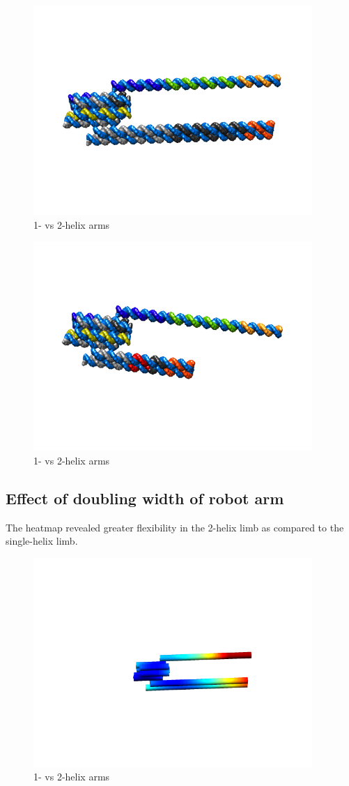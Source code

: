 \documentclass{article}
\begin{document}
\begin{figure}
\includegraphics[width=300pt]{long_atomic}
\caption{1- vs 2-helix arms}
  \label{fig:long_atomic}
\end{figure}

\begin{figure}
\includegraphics[width=300pt]{short_atomic}
\caption{1- vs 2-helix arms}
  \label{fig:short_atomic}
\end{figure}


\subsection{Effect of doubling width of robot arm}
The heatmap revealed greater flexibility in the 2-helix limb as compared to the single-helix limb. 
\begin{figure}
    \includegraphics[width=300pt]{single_arm_vs_double_heat}
  \caption{1- vs 2-helix arms}
  \label{fig:single_arm}
\end{figure}
\end{document}

